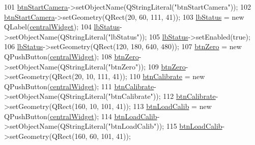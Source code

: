 \begin{DoxyCode}
101         \hyperlink{class_ui___rigid_track_class_a72fc55bdb6021b52b9ec0e97e112d57d}{btnStartCamera}->setObjectName(QStringLiteral(\textcolor{stringliteral}{"btnStartCamera"}));
102         \hyperlink{class_ui___rigid_track_class_a72fc55bdb6021b52b9ec0e97e112d57d}{btnStartCamera}->setGeometry(QRect(20, 60, 111, 41));
103         \hyperlink{class_ui___rigid_track_class_abeac37c5be33dbe8f2805a9e688b8329}{lbStatus} = \textcolor{keyword}{new} QLabel(\hyperlink{class_ui___rigid_track_class_ad0855ddf1efd8f0c8821dd2142f6221d}{centralWidget});
104         \hyperlink{class_ui___rigid_track_class_abeac37c5be33dbe8f2805a9e688b8329}{lbStatus}->setObjectName(QStringLiteral(\textcolor{stringliteral}{"lbStatus"}));
105         \hyperlink{class_ui___rigid_track_class_abeac37c5be33dbe8f2805a9e688b8329}{lbStatus}->setEnabled(\textcolor{keyword}{true});
106         \hyperlink{class_ui___rigid_track_class_abeac37c5be33dbe8f2805a9e688b8329}{lbStatus}->setGeometry(QRect(120, 180, 640, 480));
107         \hyperlink{class_ui___rigid_track_class_acc37707b26574be199e2f33d2f2c31fe}{btnZero} = \textcolor{keyword}{new} QPushButton(\hyperlink{class_ui___rigid_track_class_ad0855ddf1efd8f0c8821dd2142f6221d}{centralWidget});
108         \hyperlink{class_ui___rigid_track_class_acc37707b26574be199e2f33d2f2c31fe}{btnZero}->setObjectName(QStringLiteral(\textcolor{stringliteral}{"btnZero"}));
109         \hyperlink{class_ui___rigid_track_class_acc37707b26574be199e2f33d2f2c31fe}{btnZero}->setGeometry(QRect(20, 10, 111, 41));
110         \hyperlink{class_ui___rigid_track_class_aac22c36a194fd08f919a8e00a78cb1b0}{btnCalibrate} = \textcolor{keyword}{new} QPushButton(\hyperlink{class_ui___rigid_track_class_ad0855ddf1efd8f0c8821dd2142f6221d}{centralWidget});
111         \hyperlink{class_ui___rigid_track_class_aac22c36a194fd08f919a8e00a78cb1b0}{btnCalibrate}->setObjectName(QStringLiteral(\textcolor{stringliteral}{"btnCalibrate"}));
112         \hyperlink{class_ui___rigid_track_class_aac22c36a194fd08f919a8e00a78cb1b0}{btnCalibrate}->setGeometry(QRect(160, 10, 101, 41));
113         \hyperlink{class_ui___rigid_track_class_aafe138bcd4b21e4608ab39f76ca6e042}{btnLoadCalib} = \textcolor{keyword}{new} QPushButton(\hyperlink{class_ui___rigid_track_class_ad0855ddf1efd8f0c8821dd2142f6221d}{centralWidget});
114         \hyperlink{class_ui___rigid_track_class_aafe138bcd4b21e4608ab39f76ca6e042}{btnLoadCalib}->setObjectName(QStringLiteral(\textcolor{stringliteral}{"btnLoadCalib"}));
115         \hyperlink{class_ui___rigid_track_class_aafe138bcd4b21e4608ab39f76ca6e042}{btnLoadCalib}->setGeometry(QRect(160, 60, 101, 41));

\end{DoxyCode}
